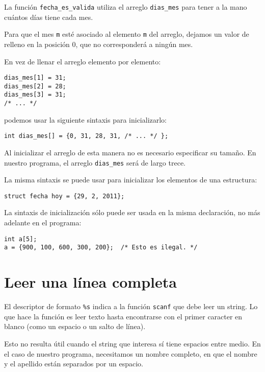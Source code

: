 La función \lstinline!fecha_es_valida! utiliza el arreglo
\lstinline!dias_mes! para tener a la mano cuántos días tiene cada mes.

Para que el mes \lstinline!m! esté asociado al elemento \lstinline!m!
del arreglo, dejamos un valor de relleno en la posición 0, que no
corresponderá a ningún mes.

En vez de llenar el arreglo elemento por elemento:

\begin{lstlisting}
dias_mes[1] = 31;
dias_mes[2] = 28;
dias_mes[3] = 31;
/* ... */
\end{lstlisting}

podemos usar la siguiente sintaxis para inicializarlo:

\begin{lstlisting}
int dias_mes[] = {0, 31, 28, 31, /* ... */ };
\end{lstlisting}

Al inicializar el arreglo de esta manera no es necesario especificar su
tamaño. En nuestro programa, el arreglo \lstinline!dias_mes! será de
largo trece.

La misma sintaxis se puede usar para inicializar los elementos de una
estructura:

\begin{lstlisting}
struct fecha hoy = {29, 2, 2011};
\end{lstlisting}

La sintaxis de inicialización sólo puede ser usada en la misma
declaración, no más adelante en el programa:

\begin{lstlisting}
int a[5];
a = {900, 100, 600, 300, 200};  /* Esto es ilegal. */
\end{lstlisting}

\section{Leer una línea completa}

El descriptor de formato \lstinline!%s! indica a la función
\lstinline!scanf! que debe leer un string. Lo que hace la función es
leer texto hasta encontrarse con el primer caracter en blanco (como un
espacio o un salto de línea).

Esto no resulta útil cuando el string que interesa sí tiene espacios
entre medio. En el caso de nuestro programa, necesitamos un nombre
completo, en que el nombre y el apellido están separados por un espacio.

